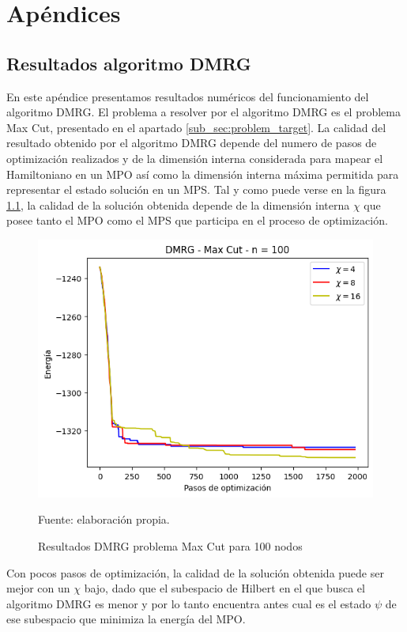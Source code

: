 \appendix
\chapter{Apéndices}

\section{Resultados algoritmo DMRG}
\label{apendix:dmrg}

En este apéndice presentamos resultados numéricos del funcionamiento del algoritmo DMRG. El problema a resolver por el algoritmo DMRG es el problema Max Cut, presentado en el apartado \ref{sub_sec:problem_target}. La calidad del resultado obtenido por el algoritmo DMRG depende del numero de pasos de optimización realizados y de la dimensión interna considerada para mapear el Hamiltoniano en un MPO así como la dimensión interna máxima permitida para representar el estado solución en un MPS. Tal y como puede verse en la figura \ref{fig:result_dmrg}, la calidad de la solución obtenida depende de la dimensión interna $\chi$ que posee tanto el MPO como el MPS que participa en el proceso de optimización.

\begin{figure}[!h]
    \centering
    \includegraphics[scale = 0.7]{plt/a01-dmrg_max_cut_n_100.png}
    \caption{Resultados DMRG problema Max Cut para 100 nodos}
    Fuente: elaboración propia.
    \label{fig:result_dmrg}
\end{figure}

Con pocos pasos de optimización, la calidad de la solución obtenida puede ser mejor con un $\chi$ bajo, dado que el subespacio de Hilbert en el que busca el algoritmo DMRG es menor y por lo tanto encuentra antes cual es el estado $\psi$ de ese subespacio que minimiza la energía del MPO. 

